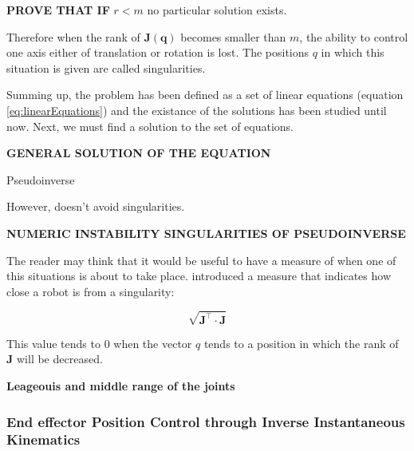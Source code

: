 \textbf{PROVE THAT IF} $r < m$ no particular solution exists.

Therefore when the rank of ${\mathbf{J}(\mathbf{{q}})}$ becomes smaller than $m$, the ability to control one axis either of translation or rotation is lost. The positions $q$ in which this situation is given are called singularities.

Summing up, the problem has been defined as a set of linear equations (equation \ref{eq:linearEquations}) and the existance of the solutions has been studied until now. Next, we must find a solution to the set of equations.

\textbf{GENERAL SOLUTION OF THE EQUATION}

Pseudoinverse

However, doesn't avoid singularities.

\textbf{NUMERIC INSTABILITY SINGULARITIES OF PSEUDOINVERSE}

The reader may think that it would be useful to have a measure of when one of this situations is about to take place. \cite{yoshikawa1985dynamic} introduced a measure that indicates how close a robot is from a singularity:

$$\sqrt{\mathbf{J^{\intercal}} \cdot \mathbf{J}}$$

This value tends to $0$ when the vector $q$ tends to a position in which the rank of $\mathbf{J}$ will be decreased.

\textbf{Leageouis and middle range of the joints}


\subsubsection{End effector Position Control through Inverse Instantaneous Kinematics}
\label{sss:eepositioncontrol}


